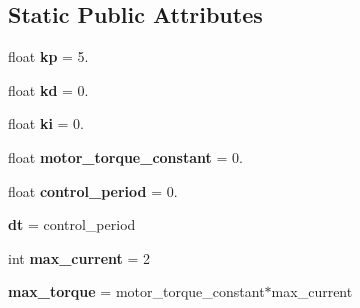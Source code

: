 \subsection*{Static Public Attributes}
\begin{DoxyCompactItemize}
\item 
float {\bfseries kp} = 5.\hypertarget{classrobot__properties__solo_1_1config_1_1SoloAbstract_a67bd22d88ac2e10f8891de035bb0063c}{}\label{classrobot__properties__solo_1_1config_1_1SoloAbstract_a67bd22d88ac2e10f8891de035bb0063c}

\item 
float {\bfseries kd} = 0.\hypertarget{classrobot__properties__solo_1_1config_1_1SoloAbstract_a9cf8dc80a83cd7d802051d19fa44acc7}{}\label{classrobot__properties__solo_1_1config_1_1SoloAbstract_a9cf8dc80a83cd7d802051d19fa44acc7}

\item 
float {\bfseries ki} = 0.\hypertarget{classrobot__properties__solo_1_1config_1_1SoloAbstract_abbe3ed441a3810045e5f1337dca80afa}{}\label{classrobot__properties__solo_1_1config_1_1SoloAbstract_abbe3ed441a3810045e5f1337dca80afa}

\item 
float {\bfseries motor\+\_\+torque\+\_\+constant} = 0.\hypertarget{classrobot__properties__solo_1_1config_1_1SoloAbstract_aa9f2d8b384d84a5beb1d8270f5f7c174}{}\label{classrobot__properties__solo_1_1config_1_1SoloAbstract_aa9f2d8b384d84a5beb1d8270f5f7c174}

\item 
float {\bfseries control\+\_\+period} = 0.\hypertarget{classrobot__properties__solo_1_1config_1_1SoloAbstract_a73fa8e2d631dd7a230780694b40cddf9}{}\label{classrobot__properties__solo_1_1config_1_1SoloAbstract_a73fa8e2d631dd7a230780694b40cddf9}

\item 
{\bfseries dt} = control\+\_\+period\hypertarget{classrobot__properties__solo_1_1config_1_1SoloAbstract_a530783f8eeff9cb8e0530ac7d07942eb}{}\label{classrobot__properties__solo_1_1config_1_1SoloAbstract_a530783f8eeff9cb8e0530ac7d07942eb}

\item 
int {\bfseries max\+\_\+current} = 2\hypertarget{classrobot__properties__solo_1_1config_1_1SoloAbstract_a941727bb80b8b7c6a9d42db0cd22d826}{}\label{classrobot__properties__solo_1_1config_1_1SoloAbstract_a941727bb80b8b7c6a9d42db0cd22d826}

\item 
{\bfseries max\+\_\+torque} = motor\+\_\+torque\+\_\+constant$\ast$max\+\_\+current\hypertarget{classrobot__properties__solo_1_1config_1_1SoloAbstract_a3aa915ebe0487dd3e18531c93c9d4935}{}\label{classrobot__properties__solo_1_1config_1_1SoloAbstract_a3aa915ebe0487dd3e18531c93c9d4935}


\end{DoxyCompactItemize}
